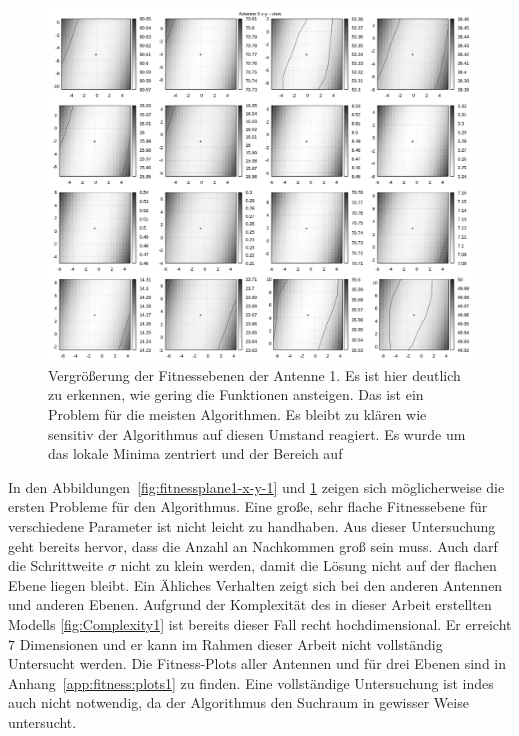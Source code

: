 \begin{figure}[ht!]
  \caption[Fitness Ebenen Heatmap, vergrößert]{Vergrößerung der Fitnessebenen der Antenne 1. Es ist hier deutlich zu erkennen, wie gering die Funktionen ansteigen. Das ist ein Problem für die meisten Algorithmen. Es bleibt zu klären wie sensitiv der Algorithmus auf diesen Umstand reagiert. Es wurde um das lokale Minima zentriert und der Bereich auf}
  \begin{center}
   \includegraphics[width=\textwidth]{img/fitness/xy_a0zoomed.png}
  \end{center}
  \label{fig:fitnessplane1-x-y-zoom-1}
%
\end{figure}
%
In den Abbildungen~\ref{fig:fitnessplane1-x-y-1} und \ref{fig:fitnessplane1-x-y-zoom-1} zeigen sich möglicherweise die ersten Probleme für den Algorithmus. Eine große, sehr flache Fitnessebene für verschiedene Parameter ist nicht leicht zu handhaben. Aus dieser Untersuchung geht bereits hervor, dass die Anzahl an Nachkommen groß sein muss. Auch darf die Schrittweite $\sigma$ nicht zu klein werden, damit die Lösung nicht auf der flachen Ebene liegen bleibt. Ein Ähliches Verhalten zeigt sich bei den anderen Antennen und anderen Ebenen. Aufgrund der Komplexität des in dieser Arbeit erstellten Modells \ref{fig:Complexity1} ist bereits dieser Fall recht hochdimensional. Er erreicht $7$ Dimensionen und er kann im Rahmen dieser Arbeit nicht vollständig Untersucht werden. Die Fitness-Plots aller Antennen und für drei Ebenen sind in Anhang~\ref{app:fitness:plots1} zu finden. Eine vollständige Untersuchung ist indes auch nicht notwendig, da der Algorithmus den Suchraum in gewisser Weise untersucht. 
